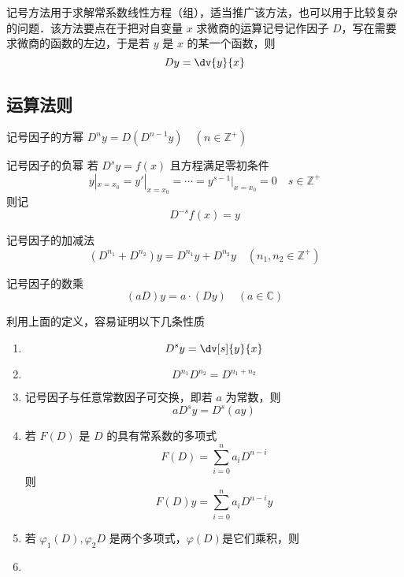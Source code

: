 
\begin{issues}
\issueDraft
\end{issues}

记号方法用于求解常系数线性方程（组），适当推广该方法，也可以用于比较复杂的问题．该方法要点在于把对自变量 $x$ 求微商的运算记号记作因子 $D$，写在需要求微商的函数的左边，于是若 $y$ 是 $x$ 的某一个函数，则
\begin{equation}
Dy=\dv{y}{x}
\end{equation}
\subsection{运算法则}
\begin{definition}{记号因子的方幂}\label{Sign_def1}
$D^ny=D(D^{n-1}y)\quad(n\in\mathbb{Z^{+}})$
\end{definition}
\begin{definition}{记号因子的负幂}
若 $D^sy=f(x)$ 且方程满足零初条件
\begin{equation}
y|_{x=x_0}=y'|_{x=x_0}=\cdots=y^{s-1}|_{x=x_0}=0\quad{s\in\mathbb{Z^{+}}}
\end{equation}
则记
\begin{equation}
D^{-s}f(x)=y
\end{equation}

\end{definition}
\begin{definition}{记号因子的加减法}
\begin{equation}
(D^{n_1}+D^{n_2})y=D^{n_1}y+D^{n_2}y\quad(n_1,n_2\in \mathbb{Z^{+
}})
\end{equation}
\end{definition}
\begin{definition}{记号因子的数乘}
\begin{equation}
(aD)y=a\cdot(Dy)\quad(a\in\mathbb{C})
\end{equation}
\end{definition}
利用上面的定义，容易证明以下几条性质
\begin{enumerate}
\item 
\begin{equation}
D^sy=\dv[s]{y}{x}
\end{equation}
\item 
\begin{equation}
D^{n_1}D^{n_2}=D^{n_1+n_2}
\end{equation}
\item 记号因子与任意常数因子可交换，即若 $a$ 为常数，则
\begin{equation}
aD^sy=D^s(ay)
\end{equation}
\item 若 $F(D)$ 是 $D$ 的具有常系数的多项式
\begin{equation}
F(D)=\sum_{i=0}^{n}a_iD^{n-i}
\end{equation}
则
\begin{equation}
F(D)y=\sum_{i=0}^{n}a_iD^{n-i}y
\end{equation}
\item 若 $\varphi_1(D),\varphi_2{D}$ 是两个多项式，$\varphi(D)$是它们乘积，则
\item
\end{enumerate}


